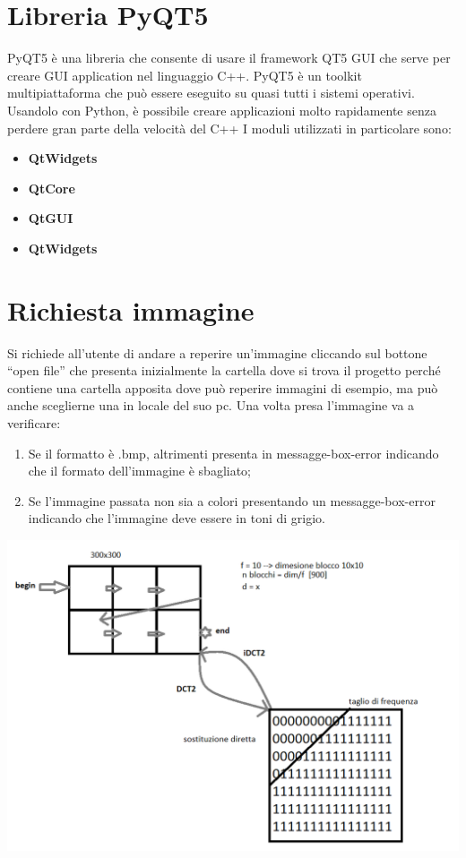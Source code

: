 \documentclass[12pt]{article}
\begin{document}
\section{Libreria PyQT5}

	PyQT5 è una libreria che consente di usare il framework QT5 GUI che serve per creare GUI application nel linguaggio C++.\newline
PyQT5 è un toolkit multipiattaforma che può essere eseguito su quasi tutti i sistemi operativi.\newline
Usandolo con Python, è possibile creare applicazioni molto rapidamente senza perdere gran parte della velocità del C++\newline
I moduli utilizzati in particolare sono:
	\begin{itemize}
		\item\textbf{QtWidgets} 
	 	\item\textbf{QtCore} 
	 	\item\textbf{QtGUI} 
	 	\item\textbf{QtWidgets} 
	\end{itemize}

\section{Richiesta immagine}

	Si richiede all’utente di andare a reperire un’immagine cliccando sul bottone “open file” che presenta inizialmente la cartella dove si trova il progetto perché contiene una cartella apposita  dove può reperire immagini di esempio, ma può anche sceglierne una in locale del suo pc.\newline
	Una volta presa l’immagine va a verificare:
	\begin{enumerate}
		\item Se il formatto è .bmp, altrimenti presenta in messagge-box-error indicando che il formato dell’immagine è sbagliato;
		\item Se l’immagine passata non sia a colori presentando un messagge-box-error indicando che l’immagine deve essere in toni di grigio.
	\end{enumerate}
	\includegraphics{immagine}
	
\end{document}
